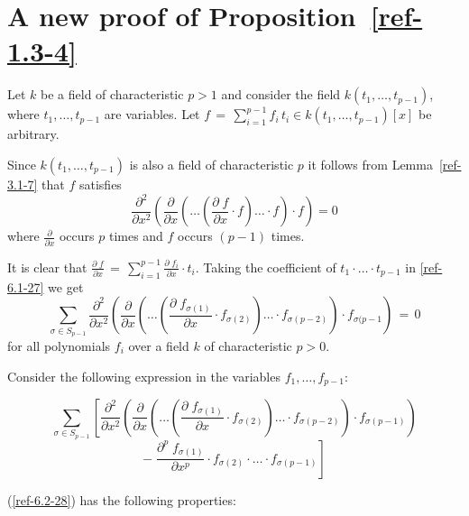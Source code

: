 \documentclass{amsart}
\numberwithin{equation}{section}
\theoremstyle{definition}
\theoremstyle{remark}
\begin{document}
\section{A new proof of Proposition~\ref{ref-1.3-4}} \label{ref-6-26}
Let $k$ be a field of characteristic $p > 1$
and consider the field $k(t_{1}, \dots ,t_{p-1})$, where $t_{1}, 
\ldots , t_{p-1}$ are variables. Let  $f\,=\, \displaystyle{ 
\sum_{i=1}^{p-1} f_{i}\,t_{i}} \in k(t_{1}, \ldots ,t_{p-1})[x]$ be arbitrary.

Since $k(t_{1}, \ldots ,t_{p-1})$ is also a field of 
characteristic $p$
it follows from Lemma~\ref{ref-3.1-7} that $f$ satisfies
\begin{equation}
\label{ref-6.1-27}
 \frac{\partial^2}{\partial x^2} \left( \frac{\partial}
{\partial x} \left( \ldots \left( \frac{\partial \; f}{\partial x} 
\cdot f \right) \ldots \cdot f \right) \cdot f \right) =0
\end{equation}
where $\displaystyle{\frac{\partial}{\partial x}}$ occurs $p$ times and 
$f$ occurs 
$(p-1)$ times.

It is clear that $\displaystyle{ \frac{\partial \;f}{\partial x} 
\,=\, \sum_{i=1}^{p-1} \frac{\partial \; f_{i}}{\partial x} \cdot t_{i}}$. 
Taking the coefficient of $t_{1} 
\cdot \ldots \cdot t_{p-1}$ in \eqref{ref-6.1-27} we get 
\[\sum_{\sigma \in S_{p-1}} \frac{\partial^{2}}{\partial x^{2}} 
\left( \frac{\partial}{\partial x} \left( \ldots \left( 
\frac{\partial \; f_{\sigma(1)}}{\partial x} \cdot f_{\sigma(2)} 
\right) \ldots \cdot f_{\sigma(p-2)} \right) \cdot f_{\sigma(p-1} 
\right) \,=\,0 \]
for all polynomials $f_{i}$ over a field $k$ of characteristic $p >0$.



Consider the following expression in the variables $f_{1}, \ldots 
,f_{p-1}$:

\begin{equation} \label{ref-6.2-28}
    \sum_{\sigma \in S_{p-1}} \left[ \frac{\partial^{2}}{\partial x^{2}} 
    \left( \frac{\partial}{\partial x} \left( \ldots \left( 
    \frac{\partial \; f_{\sigma(1)}}{\partial x} \cdot f_{\sigma(2)} 
    \right) \ldots \cdot f_{\sigma(p-2)} \right) \cdot 
    f_{\sigma(p-1)} \right) \right.
\end{equation}
\[ \left. -\; \frac{\partial^{p} \; f_{\sigma(1)}}{\partial x^{p}} 
    \cdot f_{\sigma(2)} \cdot \ldots \cdot f_{\sigma(p-1)} \right] \]


(\ref{ref-6.2-28}) has the following properties:
\end{document}
